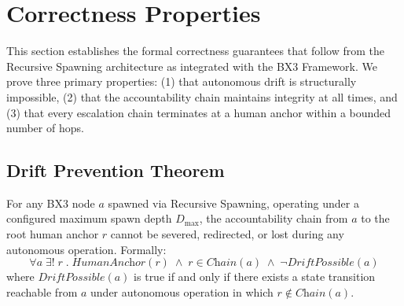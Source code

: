 \section{Correctness Properties}
\label{sec:correctness}

This section establishes the formal correctness guarantees that follow from the Recursive Spawning architecture as integrated with the BX3 Framework. We prove three primary properties: (1) that autonomous drift is structurally impossible, (2) that the accountability chain maintains integrity at all times, and (3) that every escalation chain terminates at a human anchor within a bounded number of hops.

\subsection{Drift Prevention Theorem}
\label{sec:drift-prevention}

\begin{theorem}
\label{th:drift-prevention}
For any BX3 node $a$ spawned via Recursive Spawning, operating under a configured maximum spawn depth $D_{\max}$, the accountability chain from $a$ to the root human anchor $r$ cannot be severed, redirected, or lost during any autonomous operation. Formally:
\[
\forall a \; \exists! \; r \;.\; \textit{HumanAnchor}(r) \;\wedge\; r \in \textit{Chain}(a) \;\wedge\; \lnot \textit{DriftPossible}(a)
\]
where $\textit{DriftPossible}(a)$ is true if and only if there exists a state transition reachable from $a$ under autonomous operation in which $r \notin \textit{Chain}(a)$.
\end{theorem}

